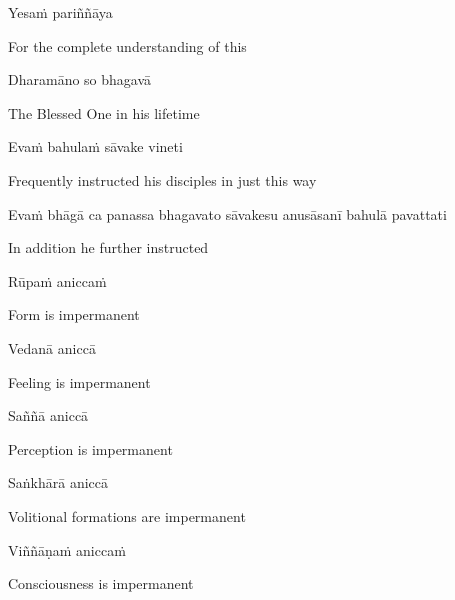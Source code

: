 Yesaṁ pariññāya

\begin{english}
  For the complete understanding of this
\end{english}

Dharamāno so bhagavā

\begin{english}
  The Blessed One in his lifetime
\end{english}

Evaṁ bahulaṁ sāvake vineti

\begin{english}
  Frequently instructed his disciples in just this way
\end{english}

\begin{pali-hang}
  Evaṁ bhāgā ca panassa bhagavato sāvakesu anusāsanī bahulā pavattati
\end{pali-hang}

\begin{english}
  In addition he further instructed
\end{english}

Rūpaṁ aniccaṁ

\begin{english}
  Form is impermanent
\end{english}

Vedanā aniccā

\begin{english}
  Feeling is impermanent
\end{english}

Saññā aniccā

\begin{english}
  Perception is impermanent
\end{english}

Saṅkhārā aniccā

\begin{english}
  Volitional formations are impermanent\hyperlink{endnote18-appendix}{\hypertarget{endnote18-body}{}}
\end{english}

Viññāṇaṁ aniccaṁ

\begin{english}
  Consciousness is impermanent\hyperlink{endnote19-appendix}{\hypertarget{endnote19-body}{}}
\end{english}

